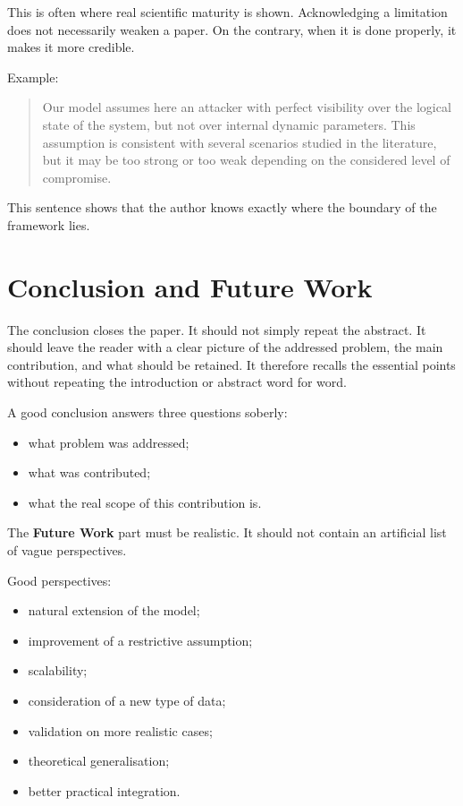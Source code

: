 \documentclass[11pt,a4paper]{article}
\theoremstyle{definition}
\begin{document}
This is often where real scientific maturity is shown. Acknowledging a limitation does not necessarily weaken a paper. On the contrary, when it is done properly, it makes it more credible.

Example:
\begin{quote}
Our model assumes here an attacker with perfect visibility over the logical state of the system, but not over internal dynamic parameters. This assumption is consistent with several scenarios studied in the literature, but it may be too strong or too weak depending on the considered level of compromise.
\end{quote}

This sentence shows that the author knows exactly where the boundary of the framework lies.

\section{Conclusion and Future Work}

The conclusion closes the paper. It should not simply repeat the abstract. It should leave the reader with a clear picture of the addressed problem, the main contribution, and what should be retained. It therefore recalls the essential points without repeating the introduction or abstract word for word.

A good conclusion answers three questions soberly:
\begin{itemize}
    \item what problem was addressed;
    \item what was contributed;
    \item what the real scope of this contribution is.
\end{itemize}

The \textbf{Future Work} part must be realistic. It should not contain an artificial list of vague perspectives.

Good perspectives:
\begin{itemize}
    \item natural extension of the model;
    \item improvement of a restrictive assumption;
    \item scalability;
    \item consideration of a new type of data;
    \item validation on more realistic cases;
    \item theoretical generalisation;
    \item better practical integration.
\end{itemize}
\end{document}
